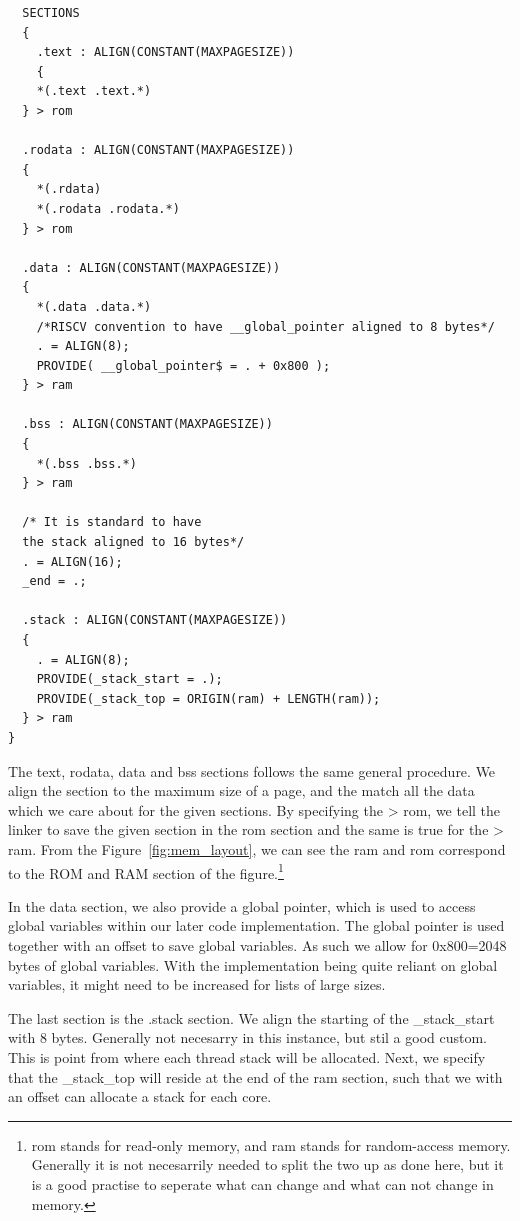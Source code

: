 \begin{lstlisting}
  SECTIONS
  {
    .text : ALIGN(CONSTANT(MAXPAGESIZE))
    {
    *(.text .text.*)
  } > rom

  .rodata : ALIGN(CONSTANT(MAXPAGESIZE))
  {
    *(.rdata)
    *(.rodata .rodata.*)
  } > rom

  .data : ALIGN(CONSTANT(MAXPAGESIZE))
  {
    *(.data .data.*)
    /*RISCV convention to have __global_pointer aligned to 8 bytes*/
    . = ALIGN(8);
    PROVIDE( __global_pointer$ = . + 0x800 );
  } > ram

  .bss : ALIGN(CONSTANT(MAXPAGESIZE))
  {
    *(.bss .bss.*)
  } > ram

  /* It is standard to have
  the stack aligned to 16 bytes*/
  . = ALIGN(16);
  _end = .;

  .stack : ALIGN(CONSTANT(MAXPAGESIZE))
  {
    . = ALIGN(8);
    PROVIDE(_stack_start = .);
    PROVIDE(_stack_top = ORIGIN(ram) + LENGTH(ram));
  } > ram
}
\end{lstlisting}
The text, rodata, data and bss sections follows the same general procedure. We
align the section to the maximum size of a page, and the match all the data
which we care about for the given sections. By specifying the > rom, we tell the
linker to save the given section in the rom section and the same is true for the
> ram. From the Figure~\ref{fig:mem_layout}, we can see the ram and rom
correspond to the ROM and RAM section of the figure.\footnote{rom stands for
  read-only memory, and ram stands for random-access memory. Generally it is not
necesarrily needed to split the two up as done here, but it is a good practise
to seperate what can change and what can not change in memory.}

In the data section, we also provide a global pointer, which is used to access
global variables within our later code implementation. The global pointer is
used together with an offset to save global variables. As such we allow for
0x800=2048 bytes of global variables. With the implementation being quite
reliant on global variables, it might need to be increased for lists of large
sizes.

The last section is the .stack section. We align the starting of the
\_stack\_start with 8 bytes. Generally not necesarry in this instance, but stil
a good custom. This is point from where each thread stack will be allocated.
Next, we specify that the \_stack\_top will reside at the end of the ram
section, such that we with an offset can allocate a stack for each core.

